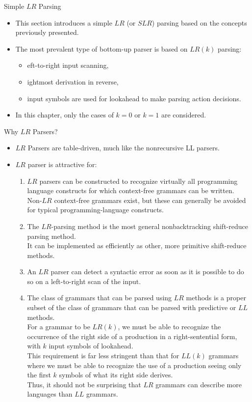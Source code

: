 \begin{bibunit}[apalike]
\begin{frame}{Simple $LR$ Parsing}
	\begin{itemize}
	\item This section introduces a simple $LR$ (or $SLR$) parsing based on the concepts previously presented.
	\vfill
	\item The most prevalent type of bottom-up parser is based on $LR(k)$ parsing:
		\begin{itemize}
		\item {}eft-to-right input scanning,
		\item {}ightmost derivation in reverse,
		\item {} input symbols are used for lookahead to make parsing action decisions.
		\end{itemize}
	\vfill
	\item In this chapter, only the cases of $k=0$ or $k=1$ are considered.
	\end{itemize}
\end{frame}

\begin{frame}[allowframebreaks]{Why $LR$ Parsers?}
	\begin{itemize}
	\item $LR$ Parsers are table-driven, much like the nonrecursive LL parsers.
	\item $LR$ parser is attractive for:
		\begin{enumerate}
		\item $LR$ parsers can be constructed to recognize virtually all programming language constructs for which context-free grammars can be written. \\
			Non-$LR$ context-free grammars exist, but these can generally be avoided for typical programming-language constructs.
		\item The $LR$-parsing method is the most general nonbacktracking shift-reduce parsing method. \\
			It can be implemented as efficiently as other, more primitive shift-reduce methods.
		\item An $LR$ parser can detect a syntactic error as soon as it is possible to do so on a left-to-right scan of the input.
		\item The class of grammars that can be parsed using $LR$ methods is a proper subset of the class of grammars that can be parsed with predictive or $LL$ methods. \\
			For a grammar to be $LR(k)$, we must be able to recognize the occurrence of the right side of a production in a right-sentential form, with $k$ input symbols of lookahead. \\
			This requirement is far less stringent than that for $LL(k)$ grammars where we must be able to recognize the use of a production seeing only the first $k$ symbols of what its right side derives. \\
			Thus, it should not be surprising that $LR$ grammars can describe more languages than $LL$ grammars.
		\end{enumerate}
	\end{itemize}
\end{frame}


\end{bibunit}
